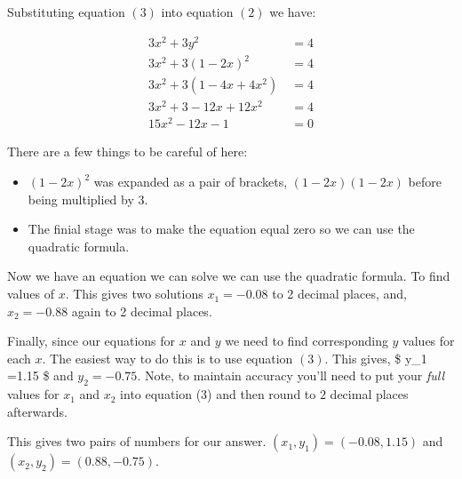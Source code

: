 \documentclass[
  a4paper,
]{scrbook}
\providecommand{\tightlist}{%
  \setlength{\itemsep}{0pt}\setlength{\parskip}{0pt}}\usepackage{longtable,booktabs,array}
\begin{document}
Substituting equation \((3)\) into equation \((2)\) we have:

\[
\begin{aligned}
3x^2+3y^2 &\ = 4 \\
3x^2+3(1-2x)^2 &\ = 4 \\
3x^2+3(1-4x+4x^2) &\ = 4 \\
3x^2+3-12x+12x^2 &\ = 4 \\
15x^2-12x-1 &\ = 0
\end{aligned}
\]

\begin{tcolorbox}[enhanced jigsaw, opacityback=0, left=2mm, toptitle=1mm, title=\textcolor{quarto-callout-warning-color}{\faExclamationTriangle}\hspace{0.5em}{Warning}, breakable, colbacktitle=quarto-callout-warning-color!10!white, opacitybacktitle=0.6, bottomtitle=1mm, arc=.35mm, colback=white, leftrule=.75mm, bottomrule=.15mm, colframe=quarto-callout-warning-color-frame, rightrule=.15mm, titlerule=0mm, toprule=.15mm, coltitle=black]

There are a few things to be careful of here:

\begin{itemize}
\tightlist
\item
  \((1-2x)^2\) was expanded as a pair of brackets, \((1-2x)(1-2x)\)
  before being multiplied by \(3\).
\item
  The finial stage was to make the equation equal zero so we can use the
  quadratic formula.
\end{itemize}

\end{tcolorbox}

Now we have an equation we can solve we can use the quadratic formula.
To find values of \(x\). This gives two solutions \(x_1 = -0.08\) to 2
decimal places, and, \(x_2 = -0.88\) again to 2 decimal places.

Finally, since our equations for \(x\) and \(y\) we need to find
corresponding \(y\) values for each \(x\). The easiest way to do this is
to use equation \((3)\). This gives, \$ y\_1 =1.15 \$ and
\(y_2 = -0.75\). Note, to maintain accuracy you'll need to put your
\emph{full} values for \(x_1\) and \(x_2\) into equation (3) and then
round to \(2\) decimal places afterwards.

This gives two pairs of numbers for our answer.
\((x_1,y_1) = (-0.08,1.15)\) and \((x_2,y_2)=(0.88,-0.75)\).
\end{document}
